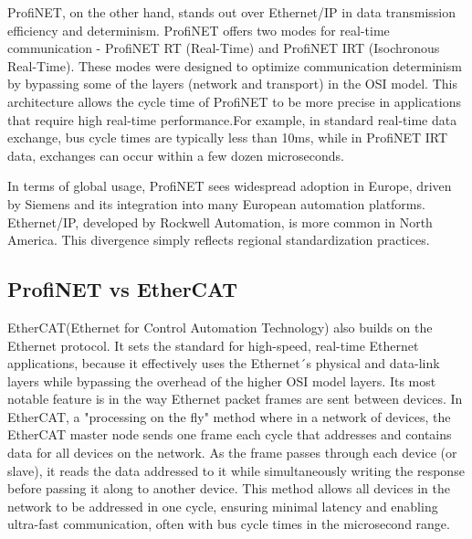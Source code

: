 \documentclass[conference]{IEEEtran}
\begin{document}
ProfiNET, on the other hand, stands out over Ethernet/IP in data transmission efficiency and determinism. ProfiNET offers two modes for real-time communication - ProfiNET RT (Real-Time) and ProfiNET IRT (Isochronous Real-Time). These modes were designed to optimize communication determinism by bypassing some of the layers (network and transport) in the OSI model\cite{ProfinetCommunicationChannels}. This architecture allows the cycle time of ProfiNET to be more precise in applications that require high real-time performance.For example, in standard real-time data exchange,  bus cycle times are typically less than 10ms, while in ProfiNET IRT data, exchanges can occur within a few dozen microseconds\cite{Eitel2020EtherNetVsPROFINET}.

In terms of global usage, ProfiNET sees widespread adoption in Europe, driven by Siemens and its integration into many European automation platforms. Ethernet/IP, developed by Rockwell Automation, is more common in North America. This divergence simply reflects regional standardization practices.


\subsection{ProfiNET vs EtherCAT}
EtherCAT(Ethernet for Control Automation Technology) also builds on the Ethernet protocol. It sets the standard for high-speed, real-time Ethernet applications\cite{Rostan2010EtherCAT}, because it effectively uses the Ethernet´s physical and data-link layers while bypassing the overhead of the higher OSI model layers. Its most notable feature is in the way Ethernet packet frames are sent between devices. In EtherCAT, a "processing on the fly" method where in a network of devices, the EtherCAT master node sends one frame each cycle that addresses and contains data for all devices on the network. As the frame passes through each device (or slave), it reads the data addressed to it while simultaneously writing the response before passing it along to another device\cite{DewesoftEtherCAT2023}. This method allows all devices in the network to be addressed in one cycle, ensuring minimal latency and enabling ultra-fast communication, often with bus cycle times in the microsecond range\cite{Rostan2010EtherCAT}.
\end{document}
